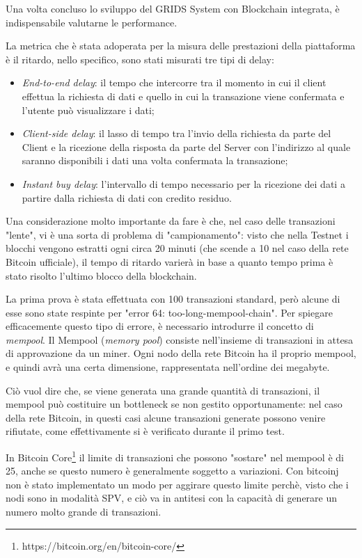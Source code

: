 Una volta concluso lo sviluppo del GRIDS System con Blockchain integrata, è indispensabile valutarne le performance.

La metrica che è stata adoperata per la misura delle prestazioni della piattaforma è il ritardo, nello specifico, sono stati misurati tre tipi di delay:

\begin{itemize}
    \item \textit{End-to-end delay}: il tempo che intercorre tra il momento in cui il client effettua la richiesta di dati e quello in cui la transazione viene confermata e l'utente può visualizzare i dati;
    \item \textit{Client-side delay}: il lasso di tempo tra l'invio della richiesta da parte del Client e la ricezione della risposta da parte del Server con l'indirizzo al quale saranno disponibili i dati una volta confermata la transazione;
    \item \textit{Instant buy delay}: l'intervallo di tempo necessario per la ricezione dei dati a partire dalla richiesta di dati con credito residuo.
\end{itemize}

Una considerazione molto importante da fare è che, nel caso delle transazioni "lente", vi è una sorta di problema di "campionamento": visto che nella Testnet i blocchi vengono estratti ogni circa 20 minuti (che scende a 10 nel caso della rete Bitcoin ufficiale), il tempo di ritardo varierà in base a quanto tempo prima è stato risolto l'ultimo blocco della blockchain.

La prima prova è stata effettuata con 100 transazioni standard, però alcune di esse sono state respinte per "error 64: too-long-mempool-chain". Per spiegare efficacemente questo tipo di errore, è necessario introdurre il concetto di \textit{mempool}.
Il Mempool (\textit{memory pool}) consiste nell'insieme di transazioni in attesa di approvazione da un miner. Ogni nodo della rete Bitcoin ha il proprio mempool, e quindi avrà una certa dimensione, rappresentata nell'ordine dei megabyte.

Ciò vuol dire che, se viene generata una grande quantità di transazioni, il mempool può costituire un bottleneck se non gestito opportunamente: nel caso della rete Bitcoin, in questi casi alcune transazioni generate possono venire rifiutate, come effettivamente si è verificato durante il primo test.

In Bitcoin Core\footnote{https://bitcoin.org/en/bitcoin-core/} il limite di transazioni che possono "sostare" nel mempool è di 25, anche se questo numero è generalmente soggetto a variazioni. Con bitcoinj non è stato implementato un modo per aggirare questo limite perchè, visto che i nodi sono in modalità SPV, e ciò va in antitesi con la capacità di generare un numero molto grande di transazioni.

